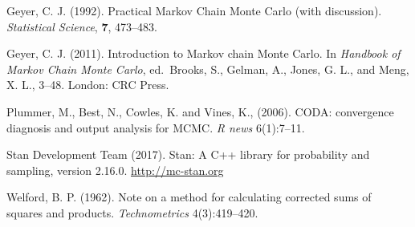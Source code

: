 \documentclass[11pt]{article}
\begin{document}
\bibitem Geyer, C. J. (1992). Practical {Markov} Chain {Monte} {Carlo} (with discussion). {\em Statistical Science}, {\bf 7}, 473--483.

\bibitem Geyer, C. J. (2011). Introduction to Markov chain Monte Carlo. In {\em Handbook of Markov Chain Monte Carlo}, ed.\ Brooks, S., Gelman, A., Jones, G. L., and Meng, X. L., 3--48.  London:  CRC Press.

\bibitem Plummer, M., Best, N., Cowles, K. and Vines, K., (2006). CODA: convergence diagnosis and output analysis for MCMC. {\em R news} 6(1):7--11.

\bibitem Stan Development Team (2017). Stan: A C++ library for probability and sampling, version 2.16.0.   \url{http://mc-stan.org}

\bibitem Welford, B. P. (1962). Note on a method for calculating corrected sums of squares and products. {\em Technometrics} 4(3):419--420.
\end{document}
